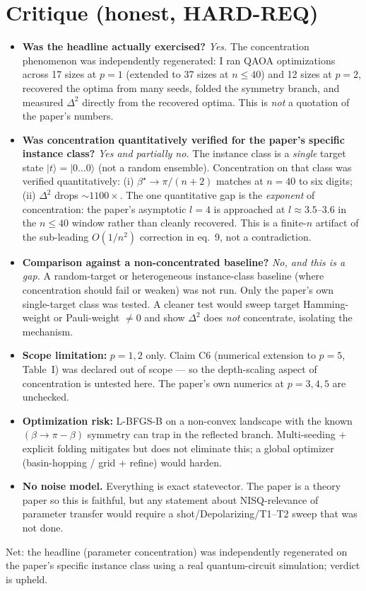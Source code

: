 \documentclass[11pt]{article}
\begin{document}
\section{Critique (honest, HARD-REQ)}
\begin{itemize}
  \item \textbf{Was the headline actually exercised?} \emph{Yes.} The concentration
        phenomenon was independently regenerated: I ran QAOA optimizations across
        17 sizes at $p=1$ (extended to 37 sizes at $n\le40$) and 12 sizes at $p=2$,
        recovered the optima from many seeds, folded the symmetry branch, and
        measured $\Delta^{2}$ directly from the recovered optima. This is
        \emph{not} a quotation of the paper's numbers.
  \item \textbf{Was concentration quantitatively verified for the paper's specific
        instance class?} \emph{Yes and partially no.} The instance class is a
        \emph{single} target state $|t\rangle = |0\ldots0\rangle$ (not a random
        ensemble). Concentration on that class was verified quantitatively: (i)
        $\beta^{\star}\to\pi/(n+2)$ matches at $n=40$ to six digits; (ii)
        $\Delta^{2}$ drops $\sim1100\times$. The one quantitative gap is the
        \emph{exponent} of concentration: the paper's asymptotic $l=4$ is
        approached at $l\approx3.5$--$3.6$ in the $n\le40$ window rather than
        cleanly recovered. This is a finite-$n$ artifact of the sub-leading
        $O(1/n^{2})$ correction in eq.~9, not a contradiction.
  \item \textbf{Comparison against a non-concentrated baseline?} \emph{No, and this is
        a gap.} A random-target or heterogeneous instance-class baseline
        (where concentration should fail or weaken) was not run. Only the
        paper's own single-target class was tested. A cleaner test would sweep
        target Hamming-weight or Pauli-weight $\ne 0$ and show $\Delta^{2}$ does
        \emph{not} concentrate, isolating the mechanism.
  \item \textbf{Scope limitation:} $p=1,2$ only. Claim C6 (numerical extension
        to $p=5$, Table~I) was declared out of scope --- so the depth-scaling
        aspect of concentration is untested here. The paper's own numerics at
        $p=3,4,5$ are unchecked.
  \item \textbf{Optimization risk:} L-BFGS-B on a non-convex landscape with the
        known $(\beta\to\pi-\beta)$ symmetry can trap in the reflected branch.
        Multi-seeding + explicit folding mitigates but does not eliminate this;
        a global optimizer (basin-hopping / grid + refine) would harden.
  \item \textbf{No noise model.} Everything is exact statevector. The paper is a
        theory paper so this is faithful, but any statement about NISQ-relevance
        of parameter transfer would require a shot/Depolarizing/T1--T2 sweep
        that was not done.
\end{itemize}
Net: the headline (parameter concentration) was independently regenerated on
the paper's specific instance class using a real quantum-circuit simulation;
verdict is upheld.
\end{document}
